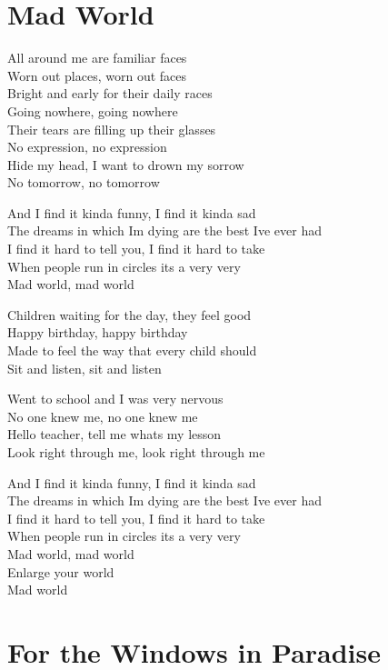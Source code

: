\documentclass[
  letterpaper,
]{scrbook}
\begin{document}
\hypertarget{mad-world}{%
\chapter{Mad World}\label{mad-world}}

All around me are familiar faces\\
Worn out places, worn out faces\\
Bright and early for their daily races\\
Going nowhere, going nowhere\\
Their tears are filling up their glasses\\
No expression, no expression\\
Hide my head, I want to drown my sorrow\\
No tomorrow, no tomorrow

And I find it kinda funny, I find it kinda sad\\
The dreams in which I\textquotesingle m dying are the best
I\textquotesingle ve ever had\\
I find it hard to tell you, I find it hard to take\\
When people run in circles it\textquotesingle s a very very\\
Mad world, mad world

Children waiting for the day, they feel good\\
Happy birthday, happy birthday\\
Made to feel the way that every child should\\
Sit and listen, sit and listen

Went to school and I was very nervous\\
No one knew me, no one knew me\\
Hello teacher, tell me what\textquotesingle s my lesson\\
Look right through me, look right through me

And I find it kinda funny, I find it kinda sad\\
The dreams in which I\textquotesingle m dying are the best
I\textquotesingle ve ever had\\
I find it hard to tell you, I find it hard to take\\
When people run in circles it\textquotesingle s a very very\\
Mad world, mad world\\
Enlarge your world\\
Mad world

\hypertarget{for-the-windows-in-paradise}{%
\chapter{For the Windows in
Paradise}\label{for-the-windows-in-paradise}}
\end{document}
